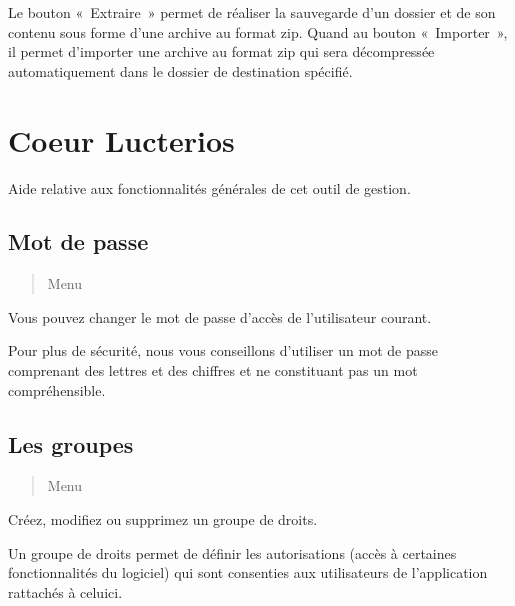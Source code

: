 \documentclass[a4paper,10pt,oneside,french]{sphinxmanual}
\begin{document}
\sphinxAtStartPar
Le bouton « Extraire » permet de réaliser la sauvegarde d’un dossier et de son contenu sous forme d’une archive au format zip.
Quand au bouton « Importer », il permet d’importer une archive au format zip qui sera décompressée automatiquement dans le dossier de destination spécifié.


\chapter{Coeur Lucterios}
\label{\detokenize{CORE/index:coeur-lucterios}}\label{\detokenize{CORE/index::doc}}
\sphinxAtStartPar
Aide relative aux fonctionnalités générales de cet outil de gestion.


\section{Mot de passe}
\label{\detokenize{CORE/password:mot-de-passe}}\label{\detokenize{CORE/password::doc}}\begin{quote}

\sphinxAtStartPar
Menu 
\end{quote}

\sphinxAtStartPar
Vous pouvez changer le mot de passe d’accès de l’utilisateur courant.

\noindent{}

\sphinxAtStartPar
Pour plus de sécurité, nous vous conseillons d’utiliser un mot de passe comprenant des lettres et des chiffres et ne constituant pas un mot compréhensible.


\section{Les groupes}
\label{\detokenize{CORE/groups:les-groupes}}\label{\detokenize{CORE/groups::doc}}\begin{quote}

\sphinxAtStartPar
Menu 
\end{quote}

\sphinxAtStartPar
Créez, modifiez ou supprimez un groupe de droits.

\noindent{}

\sphinxAtStartPar
Un groupe de droits permet de définir les autorisations (accès à certaines fonctionnalités du logiciel) qui sont consenties aux utilisateurs de l’application rattachés à celui\sphinxhyphen{}ci.
\end{document}
